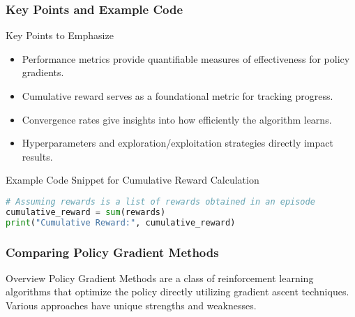 \documentclass{beamer}
\begin{document}
\begin{frame}[fragile]
    \frametitle{Key Points and Example Code}

    \begin{block}{Key Points to Emphasize}
        \begin{itemize}
            \item Performance metrics provide quantifiable measures of effectiveness for policy gradients.
            \item Cumulative reward serves as a foundational metric for tracking progress.
            \item Convergence rates give insights into how efficiently the algorithm learns.
            \item Hyperparameters and exploration/exploitation strategies directly impact results.
        \end{itemize}
    \end{block}

    \begin{block}{Example Code Snippet for Cumulative Reward Calculation}
        \begin{lstlisting}[language=Python]
# Assuming rewards is a list of rewards obtained in an episode
cumulative_reward = sum(rewards)
print("Cumulative Reward:", cumulative_reward)
        \end{lstlisting}
    \end{block}
\end{frame}

\begin{frame}[fragile]
    \frametitle{Comparing Policy Gradient Methods}
    \begin{block}{Overview}
        Policy Gradient Methods are a class of reinforcement learning algorithms that optimize the policy directly utilizing gradient ascent techniques. Various approaches have unique strengths and weaknesses.
    \end{block}
\end{frame}
\end{document}
